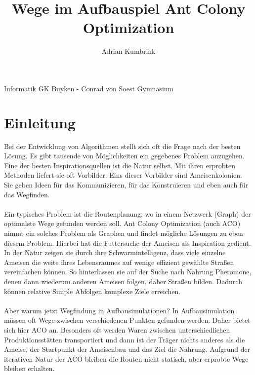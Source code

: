 \documentclass[12pt]{article}
\title{Wege im Aufbauspiel \linebreak Ant Colony Optimization}
\author{Adrian Kumbrink}
\begin{document}
\begin{titlepage}


\maketitle
\thispagestyle{empty}

\vspace*{\fill}
\begin{center}
Informatik GK Buyken - Conrad von Soest Gymnasium
\end{center}

\end{titlepage}



\thispagestyle{empty}
\tableofcontents
\pagebreak


\section{Einleitung} \label{Einleitung}
Bei der Entwicklung von Algorithmen stellt sich oft die Frage nach der besten Lösung. Es gibt tausende von Möglichkeiten ein gegebenes Problem anzugehen. Eine der besten Inspirationsquellen ist die Natur selbst. Mit ihren erprobten Methoden liefert sie oft Vorbilder. Eins dieser Vorbilder sind Ameisenkolonien. Sie geben Ideen für das Kommunizieren, für das Konstruieren und eben auch für das Wegfinden.\\\\
Ein typisches Problem ist die Routenplanung, wo in einem Netzwerk (Graph) der optimalste Wege gefunden werden soll. Ant Colony Optimization (auch ACO) nimmt ein solches Problem als Graphen und findet mögliche Lösungen zu eben diesem Problem. Hierbei hat die Futtersuche der Ameisen als Inspiration gedient. In der Natur zeigen sie durch ihre Schwarmintelligenz, dass viele einzelne Ameisen die weite ihres Lebensraumes auf wenige effizient gewählte Straßen vereinfachen können. So hinterlassen sie auf der Suche nach Nahrung Pheromone, denen dann wiederum anderen Ameisen folgen, daher Straßen bilden. Dadurch können  relative Simple Abfolgen komplexe Ziele erreichen.\\\\
Aber warum jetzt Wegfindung in Aufbausimulationen? In Aufbausimulation müssen oft Wege zwischen verschiedenen Punkten gefunden werden. Daher bietet sich hier ACO an. Besonders oft werden Waren zwischen unterschiedlichen Produktionsstätten transportiert und dann ist der Träger nichts anderes als die Ameise, der Startpunkt der Ameisenbau und das Ziel die Nahrung. Aufgrund der iterativen Natur der ACO bleiben die Routen nicht statisch, aber erprobte Wege bleiben erhalten.
\end{document}
